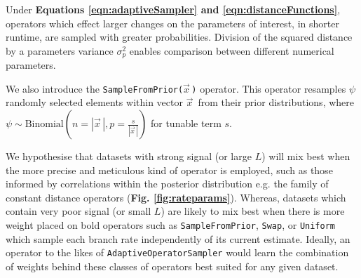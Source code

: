 \documentclass[10pt,letterpaper]{article}
\begin{document}



Under \textbf{Equations \ref{eqn:adaptiveSampler} and \ref{eqn:distanceFunctions}}, operators which effect larger changes on the parameters of interest, in shorter runtime, are sampled with greater probabilities. 
Division of the squared distance by a parameters variance $\sigma^2_p$ enables comparison between different numerical parameters.



We also introduce the \texttt{SampleFromPrior($\vec{x}^{\,}$)} operator.
This operator resamples $\psi$ randomly selected elements within vector $\vec{x}^{\,}$ from their prior distributions, where $\psi \sim \text{Binomial}(n=|\vec{x}^{\,}|, p=\frac{s}{|\vec{x}^{\,}|})$ for tunable term $s$.




We hypothesise that datasets with strong signal (or large $L$) will mix best when the more precise and meticulous kind of operator is employed, such as those informed by correlations within the posterior distribution e.g. the family of constant distance operators \cite{zhang2020improving} (\textbf{Fig. \ref{fig:rateparams}}).
Whereas, datasets which contain very poor signal (or small $L$) are likely to mix best when there is more weight placed on bold operators such as \texttt{SampleFromPrior}, \texttt{Swap}, or \texttt{Uniform} which sample each branch rate independently of its current estimate.
Ideally, an operator to the likes of \texttt{AdaptiveOperatorSampler} would learn the combination of weights behind these classes of operators best suited for any given dataset.
\end{document}
